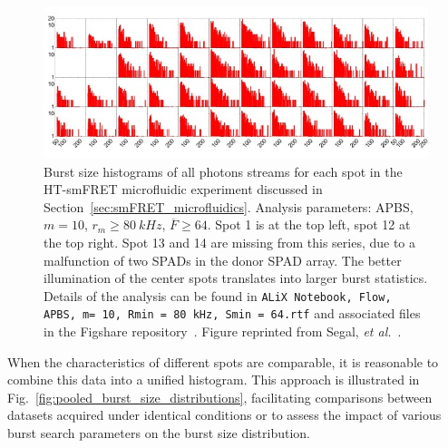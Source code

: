 \begin{figure}
\centering
\includegraphics[width=\textwidth]{chapters/figures/flow_burst_size_48_spots.jpg}
\caption{\label{fig:flow_burst_size_48_spots}
Burst size histograms of all photons streams for each spot in the \ac{HT-smFRET} microfluidic experiment discussed in Section~\ref{sec:smFRET_microfluidics}. 
Analysis parameters: \ac{APBS}, $m = 10$, $r_m \geq 80~kHz$,
$\overline{F} \geq 64$. 
Spot 1 is at the top left, spot 12 at the top right. 
Spot 13 and 14 are missing from this series,
due to a malfunction of two SPADs in the donor SPAD array. 
The better illumination of the center spots translates into larger burst statistics.
Details of the analysis can be found in \texttt{ALiX Notebook, Flow, \ac{APBS}, m= 10, Rmin = 80 kHz, Smin = 64.rtf} and associated files in the Figshare repository~\cite{figshare_repo_2019}. 
Figure reprinted from Segal, \textit{et al.}~\cite{segal_methods_2019}.
}
\end{figure}

When the characteristics of different spots are comparable, it is reasonable to combine this data into a unified histogram. 
This approach is illustrated in Fig.~\ref{fig:pooled_burst_size_distributions}, facilitating comparisons between datasets acquired under identical conditions or to assess the impact of various burst search parameters on the burst size distribution.

